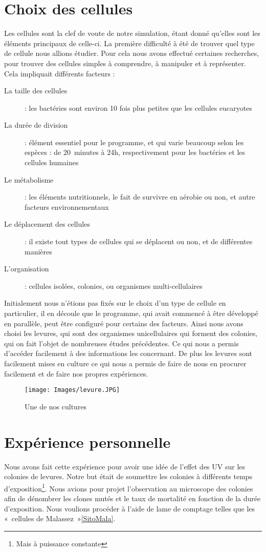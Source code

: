 \section{Choix des cellules}
Les cellules sont la clef de voute de notre simulation, étant donné qu'elles sont les éléments principaux de celle-ci. 
La première difficulté à été de trouver quel type de cellule nous allions étudier. Pour cela nous avons effectué certaines recherches, pour trouver des cellules simples à comprendre, à manipuler et à représenter.
Cela impliquait différents facteurs : 
\begin{description}
  \item[La taille des cellules] : les bactéries sont environ 10 fois plus petites que les cellules eucaryotes 
  \item[La durée de division] : élément essentiel pour le programme, et qui varie beaucoup selon les espèces : de 20 minutes à 24h, respectivement pour les bactéries et les cellules humaines
  \item[Le métabolisme] : les éléments nutritionnels, le fait de survivre en aérobie ou non, et autre facteurs environnementaux
  \item[Le déplacement des cellules] : il existe tout types de cellules qui se déplacent ou non, et de différentes manières
  \item[L'organisation] : cellules isolées, colonies, ou organismes multi-cellulaires
\end{description}

Initialement nous n'étions pas fixés sur le choix d'un type de cellule en particulier, il en découle que le programme, qui avait commencé à être développé en parallèle, peut être configuré pour certains des facteurs.
Ainsi nous avons choisi les levures, qui sont des organismes unicellulaires qui forment des colonies, qui on fait l'objet de nombreuses études précédentes. Ce qui nous a permis d'accéder facilement à des informations les concernant.
De plus les levures sont facilement mises en culture ce qui nous a permis de faire de nous en procurer facilement et de faire nos propres expériences. 

\begin{figure}[H]
	\begin{center}
		\texttt{[image: Images/levure.JPG]}
	\end{center}
	\caption{Une de nos cultures}
\end{figure}

\section{Expérience personnelle}
Nous avons fait cette expérience pour avoir une idée de l'effet des UV sur les colonies de levures. 
Notre but était de soumettre les colonies à différents temps d'exposition\footnote{Mais à puissance constante}. 
Nous avions pour projet l'observation au microscope des colonies afin de dénombrer les clones mutés et le 
taux de mortalité en fonction de la durée d'exposition.
Nous voulions procéder à l'aide de lame de comptage telles que les «~cellules de Malassez~»\ref{SitoMala}.

